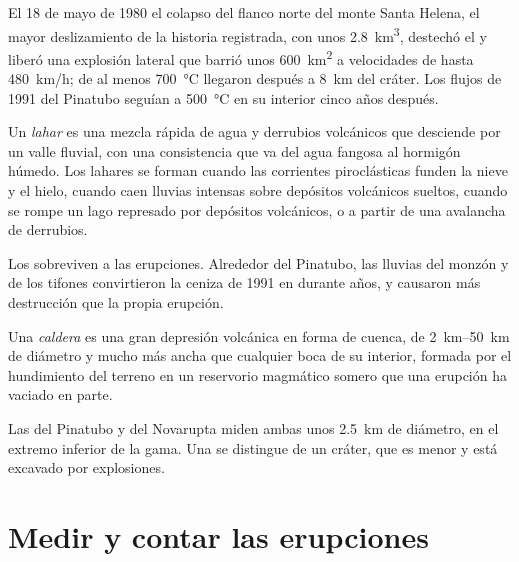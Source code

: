 El 18 de mayo de 1980 el colapso del flanco norte del monte Santa Helena, el mayor
deslizamiento de la historia registrada, con unos \qty{2.8}{km^3}, destechó el  y
liberó una explosión lateral que barrió unos \qty{600}{km^2} a velocidades de hasta
\qty{480}{km/h};  de al menos \qty{700}{\celsius} llegaron después a
\qty{8}{km} del cráter. Los flujos de 1991 del Pinatubo seguían a
\qty{500}{\celsius} en su interior cinco años después.

\begin{definition}[Lahar]\label{def:b2:eruptive-styles:lahar}
Un \emph{lahar} es una mezcla rápida de agua y derrubios volcánicos
que desciende por un valle fluvial, con una consistencia que va del agua fangosa
al hormigón húmedo. Los lahares se forman cuando las corrientes piroclásticas funden la nieve y el hielo, cuando
caen lluvias intensas sobre depósitos volcánicos sueltos, cuando se rompe un lago represado por depósitos
volcánicos, o a partir de una avalancha de derrubios.
\end{definition}

Los  sobreviven a las erupciones. Alrededor del Pinatubo, las lluvias del monzón y de los tifones convirtieron la
ceniza de 1991 en  durante años, y causaron más destrucción que la
propia erupción.

\begin{definition}[Caldera]\label{def:b2:eruptive-styles:caldera}
Una \emph{caldera} es una gran depresión volcánica en forma de cuenca,
de \qtyrange{2}{50}{km} de diámetro y mucho más ancha que cualquier boca de su interior, formada por
el hundimiento del terreno en un reservorio magmático somero que una erupción ha
vaciado en parte.
\end{definition}

Las  del Pinatubo y del Novarupta miden ambas unos \qty{2.5}{km} de diámetro, en el
extremo inferior de la gama. Una  se distingue de un cráter, que es menor y está excavado por explosiones.

\section{Medir y contar las erupciones}

